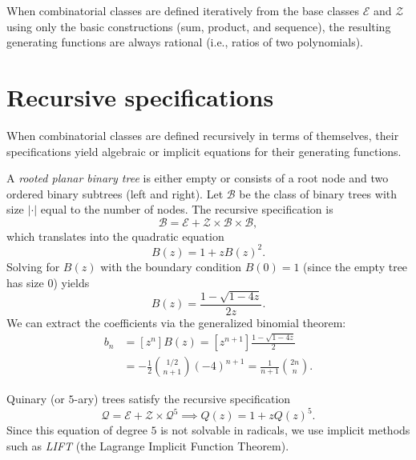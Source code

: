 
When combinatorial classes are defined iteratively from the base classes \(\mathcal{E}\) and \(\mathcal{Z}\) using only the basic constructions (sum, product, and sequence), the resulting generating functions are always rational (i.e., ratios of two polynomials).

\section*{Recursive specifications}

When combinatorial classes are defined recursively in terms of themselves, their specifications yield algebraic or implicit equations for their generating functions.

\begin{example}
    A \emph{rooted planar binary tree} is either empty or consists of a root node and two ordered binary subtrees (left and right).
    Let \(\mathcal{B}\) be the class of binary trees with size \(|\cdot|\) equal to the number of nodes.
    The recursive specification is
    \[
        \mathcal{B} = \mathcal{E} + \mathcal{Z} \times \mathcal{B} \times \mathcal{B},
    \]
    which translates into the quadratic equation
    \[
        B(z) = 1 + z B(z)^2.
    \]
    Solving for \(B(z)\) with the boundary condition \(B(0) = 1\) (since the empty tree has size \(0\)) yields
    \[
        B(z) = \frac{1 - \sqrt{1-4z}}{2z}.
    \]
    We can extract the coefficients via the generalized binomial theorem:
    \begin{align*}
        b_n &= [z^n] B(z) = [z^{n+1}] \frac{1 - \sqrt{1-4z}}{2} \\
        &= -\frac{1}{2} \binom{1/2}{n+1} (-4)^{n+1} = \frac{1}{n+1} \binom{2n}{n}.
    \end{align*}
\end{example}

\begin{example}
    Quinary (or \(5\)-ary) trees satisfy the recursive specification
    \[
        \mathcal{Q} = \mathcal{E} + \mathcal{Z} \times \mathcal{Q}^5 \implies Q(z) = 1 + z Q(z)^5.
    \]
    Since this equation of degree \(5\) is not solvable in radicals, we use implicit methods such as \emph{LIFT} (the Lagrange Implicit Function Theorem).
\end{example}

